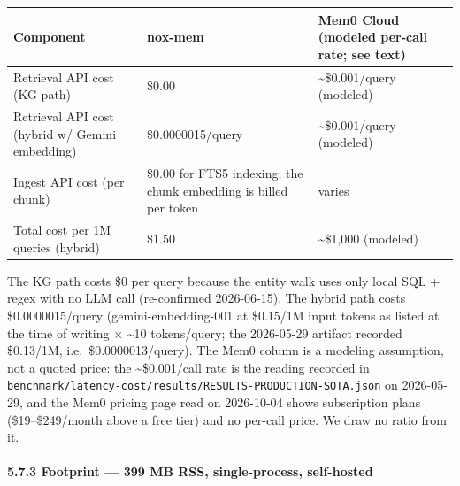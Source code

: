 \documentclass[
]{article}
\newcounter{none} %
\begin{document}
{\def\LTcaptype{none} %
\begin{longtable}[]{@{}
  >{\raggedright\arraybackslash}p{}
  >{\raggedleft\arraybackslash}p{}
  >{\raggedleft\arraybackslash}p{}@{}}
\toprule\noalign{}
\begin{minipage}[b]{\linewidth}\raggedright
Component
\end{minipage} & \begin{minipage}[b]{\linewidth}\raggedleft
nox-mem
\end{minipage} & \begin{minipage}[b]{\linewidth}\raggedleft
Mem0 Cloud (modeled per-call rate; see text)
\end{minipage} \\
\midrule\noalign{}
\endhead
\bottomrule\noalign{}
\endlastfoot
Retrieval API cost (KG path) & \$0.00 & \textasciitilde\$0.001/query
(modeled) \\
Retrieval API cost (hybrid w/ Gemini embedding) & \$0.0000015/query &
\textasciitilde\$0.001/query (modeled) \\
Ingest API cost (per chunk) & \$0.00 for FTS5 indexing; the chunk
embedding is billed per token & varies \\
Total cost per 1M queries (hybrid) & \$1.50 & \textasciitilde\$1,000
(modeled) \\
\end{longtable}
}

The KG path costs \$0 per query because the entity walk uses only local
SQL + regex with no LLM call (re-confirmed 2026-06-15). The hybrid path
costs \$0.0000015/query (gemini-embedding-001 at \$0.15/1M input tokens
as listed at the time of writing × \textasciitilde10 tokens/query; the
2026-05-29 artifact recorded \$0.13/1M, i.e.~\$0.0000013/query). The
Mem0 column is a modeling assumption, not a quoted price: the
\textasciitilde\$0.001/call rate is the reading recorded in
\texttt{benchmark/latency-cost/results/RESULTS-PRODUCTION-SOTA.json} on
2026-05-29, and the Mem0 pricing page read on 2026-10-04 shows
subscription plans (\$19--\$249/month above a free tier) and no per-call
price. We draw no ratio from it.

\paragraph{5.7.3 Footprint --- 399 MB RSS, single-process,
self-hosted}\label{footprint-399-mb-rss-single-process-self-hosted}
\end{document}
